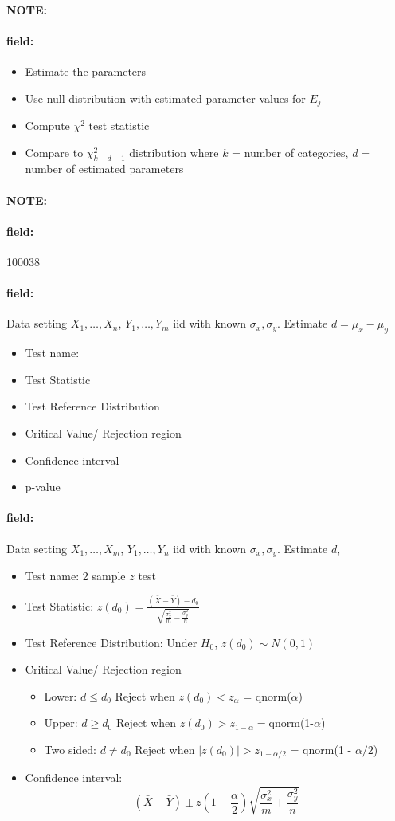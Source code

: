 \documentclass[12pt]{article}
\newenvironment{note}{\paragraph{NOTE:}}{}
\newenvironment{field}{\paragraph{field:}}{}
\begin{document}
\begin{note}
\begin{field}
\begin{itemize}
         \begin{itemize}
          \item Estimate the parameters
          \item Use null distribution with estimated parameter values for $E_j$
          \item Compute $\chi^2$ test statistic
          \item Compare to $\chi_{k-d-1}^2$ distribution where $k$ = number of categories, $d = $ number of estimated parameters
         \end{itemize}
  \end{itemize}
 \end{field}
\end{note}


\begin{note} \begin{field} \tiny 100038 \end{field}
 \begin{field}
  Data setting $X_1, \ldots , X_n$, $Y_1, \ldots, Y_m$ iid with known $\sigma_x, \sigma_y$. Estimate $d = \mu_x - \mu_y$
  \begin{itemize}
   \item Test name:
   \item Test Statistic
   \item Test Reference Distribution
   \item Critical Value/ Rejection region
   \item Confidence interval
   \item p-value
  \end{itemize}
 \end{field}
 \begin{field}
  Data setting $X_1, \ldots , X_m$, $Y_1, \ldots, Y_n$ iid with known $\sigma_x, \sigma_y$. Estimate $d$,
  \begin{itemize}
   \item Test name: 2 sample $z$ test
   \item Test Statistic: $z(d_0) = \frac{(\bar{X}- \bar{Y}) - d_0}{\sqrt{\frac{\sigma_x^2}{m} - \frac{\sigma_y^2}{n}}}$
   \item Test Reference Distribution: Under $H_0$, $z(d_0) \sim N(0,1)$
   \item Critical Value/ Rejection region
         \begin{itemize}
          \item Lower: $d \leq d_0$ Reject when $z(d_0) < z_{\alpha}$ = qnorm($\alpha$)
          \item Upper: $d \geq d_0$ Reject when $z(d_0) > z_{1 - \alpha} = $qnorm(1-$\alpha$)
          \item Two sided: $d \neq d_0$ Reject when $|z(d_0)| > z_{1 - \alpha/2}$ = qnorm(1 - $\alpha/2$)
         \end{itemize}
   \item Confidence interval: $$ (\bar{X} - \bar{Y}) \pm z(1 - \frac{\alpha}{2})\sqrt{\frac{\sigma_x^2}{m} + \frac{\sigma_y^2}{n}} $$
  \end{itemize}
 \end{field}
\end{note}
\end{document}
